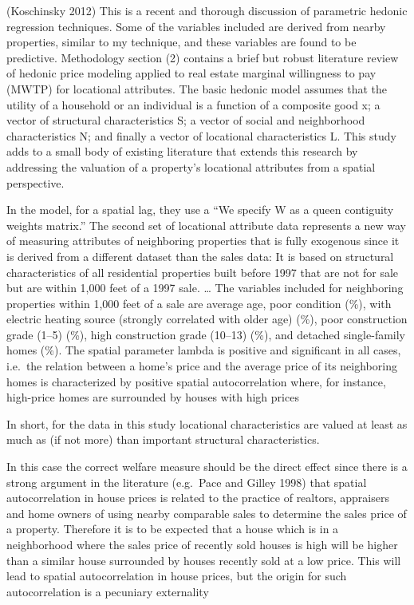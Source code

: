 \documentclass[]{article}
\begin{document}
(Koschinsky 2012) This is a recent and thorough discussion of parametric
hedonic regression techniques. Some of the variables included are
derived from nearby properties, similar to my technique, and these
variables are found to be predictive. Methodology section (2) contains a
brief but robust literature review of hedonic price modeling applied to
real estate marginal willingness to pay (MWTP) for locational
attributes. The basic hedonic model assumes that the utility of a
household or an individual is a function of a composite good x; a vector
of structural characteristics S; a vector of social and neighborhood
characteristics N; and finally a vector of locational characteristics L.
This study adds to a small body of existing literature that extends this
research by addressing the valuation of a property's locational
attributes from a spatial perspective.

In the model, for a spatial lag, they use a ``We specify W as a queen
contiguity weights matrix.'' The second set of locational attribute data
represents a new way of measuring attributes of neighboring properties
that is fully exogenous since it is derived from a different dataset
than the sales data: It is based on structural characteristics of all
residential properties built before 1997 that are not for sale but are
within 1,000 feet of a 1997 sale. \ldots{} The variables included for
neighboring properties within 1,000 feet of a sale are average age, poor
condition (\%), with electric heating source (strongly correlated with
older age) (\%), poor construction grade (1--5) (\%), high construction
grade (10--13) (\%), and detached single-family homes (\%). The spatial
parameter lambda is positive and significant in all cases, i.e.~the
relation between a home's price and the average price of its neighboring
homes is characterized by positive spatial autocorrelation where, for
instance, high-price homes are surrounded by houses with high prices

In short, for the data in this study locational characteristics are
valued at least as much as (if not more) than important structural
characteristics.

In this case the correct welfare measure should be the direct effect
since there is a strong argument in the literature (e.g.~Pace and Gilley
1998) that spatial autocorrelation in house prices is related to the
practice of realtors, appraisers and home owners of using nearby
comparable sales to determine the sales price of a property. Therefore
it is to be expected that a house which is in a neighborhood where the
sales price of recently sold houses is high will be higher than a
similar house surrounded by houses recently sold at a low price. This
will lead to spatial autocorrelation in house prices, but the origin for
such autocorrelation is a pecuniary externality
\end{document}
